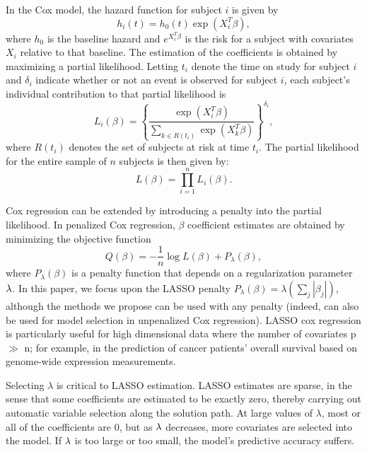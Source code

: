 In the Cox model, the hazard function for subject $i$ is given by 
\begin{equation*}
  h_{i}(t) = h_{0}(t) \exp( X_{i}^{T} \beta),
\end{equation*} 
where $h_{0}$ is the baseline hazard and $e^{X_i^{T} \beta}$ is the risk for a subject with covariates $X_i$ relative to that baseline.  The estimation of the coefficients is obtained by maximizing a partial likelihood.  Letting $t_i$ denote the time on study for subject $i$ and $\delta_{i}$ indicate whether or not an event is observed for subject $i$, each subject's individual contribution to that partial likelihood is
\begin{equation*}
  L_{i}(\beta) = \left \{\frac{\exp ( X_{i}^{T} \beta)}{\sum_{ k \in R(t_{i})}\exp ( X_{k}^{T} \beta)}\right \}^{\delta_{i}},
\end{equation*}
where $R(t_{i})$ denotes the set of subjects at risk at time $t_{i}$.  The partial likelihood for the entire sample of $n$ subjects is then given by:
\begin{equation*}
  L(\beta) =\prod_{i = 1}^{n} L_{i}(\beta).
\end{equation*}

Cox regression can be extended by introducing a penalty into the partial likelihood.  In penalized Cox regression, $\beta$ coefficient estimates are obtained by minimizing the objective function
\begin{equation}
  \label{eq:obj}
  Q(\beta) = - \frac{1}{n} \log L(\beta) + P_{\lambda}(\beta),
\end{equation}
where $P_{\lambda}(\beta)$ is a penalty function that depends on a regularization parameter $\lambda$. In this paper, we focus upon the LASSO penalty $P_{\lambda}(\beta) = \lambda (\sum_{j} |\beta_{j}|)$, although the methods we propose can be used with any penalty (indeed, can also be used for model selection in unpenalized Cox regression).  LASSO cox regression is particularly useful for high dimensional data where the number of covariates p $\gg$ n; for example, in the prediction of cancer patients' overall survival based on genome-wide expression measurements.

Selecting $\lambda$ is critical to LASSO estimation. LASSO estimates are sparse, in the sense that some coefficients are estimated to be exactly zero, thereby carrying out automatic variable selection along the solution path. At large values of $\lambda$, most or all of the coefficients are 0, but as $\lambda$ decreases, more covariates are selected into the model. If $\lambda$ is too large or too small, the model's predictive accuracy suffers.

